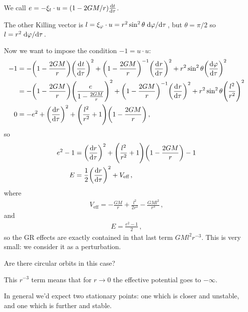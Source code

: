 \documentclass[main.tex]{subfiles}
\begin{document}
We call \(e = - \xi_t \cdot u = (1 - 2GM/r) \dv{t}{\tau }\).

The other Killing vector is \(l = \xi_\varphi \cdot u  =  r^2 \sin^2 \theta \dv*{\varphi }{\tau }\), but \(\theta = \pi /2\) so \(l = r^2 \dv*{\varphi }{\tau }\). 

Now we want to impose the condition \(-1 = u \cdot u\): 
%
\begin{subequations}
\begin{align}
  -1 &=
  - \qty(1 - \frac{2GM}{r}) \qty(\dv[]{t}{\tau })^2
  + \qty(1 - \frac{2GM}{r})^{-1} \qty(\dv[]{r}{\tau })^2
  + r^2 \sin^2 \theta \qty(\dv{\varphi }{\tau })^2  \\
  &=
  - \qty(1 - \frac{2GM}{r}) \qty(\frac{e}{1 - \frac{2GM}{r}})^2
  + \qty(1 - \frac{2GM}{r})^{-1} \qty(\dv[]{r}{\tau })^2
  + r^2 \sin^2 \theta \qty(\frac{l^2}{r^2})^2  \\
  0&= - e^2 + \qty(\dv{r}{\tau })^2
  + \qty(\frac{l^2}{r^2}+1) \qty(1 - \frac{2GM}{r})
\,,
\end{align}
\end{subequations}
%
so 
%
\begin{subequations}
\begin{align}
  e^2-1 &= \qty(\dv{r}{\tau })^2 + \qty(\frac{l^2}{r^2} +1)
  \qty(1 - \frac{2GM}{r}) - 1 \\
  E &=  \frac{1}{2} \qty(\dv{r}{\tau })^2
  + V _{\text{eff}}
\,,
\end{align}
\end{subequations}
%
where 
%
\begin{align}
  V_{\text{eff}} = - \frac{GM}{r} + \frac{l^2}{2 r^2} - \frac{GMl^2}{r^3}
\,,
\end{align}
%
and 
%
\begin{align}
  E = \frac{e^2-1}{2}
\,,
\end{align}
%
so the GR effects are exactly contained in that last term \(GMl^2r^{-3}\). This is very small: we consider it as a perturbation.

Are there circular orbits in this case? 

This \(r^{-3}\) term means that for \(r \rightarrow 0\) the effective potential goes to \(- \infty\).

In general we'd expect two stationary points: one which is closer and unstable, and one which is further and stable.
\end{document}
